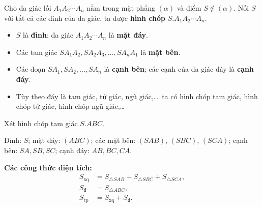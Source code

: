 \documentclass[11pt,a4paper]{article}
\newcommand{\exampletitle}[2]{\vspace{3pt}\noindent{\bfseries\textcolor{answerblue}{Ví dụ #1.}} #2\par\vspace{2pt}}
\begin{document}
Cho đa giác lồi $A_1A_2\cdots A_n$ nằm trong mặt phẳng $(\alpha)$
và điểm $S\notin(\alpha)$. Nối $S$ với tất cả các đỉnh của đa giác,
ta được \textbf{hình chóp} $S.A_1A_2\cdots A_n$.
\begin{itemize}
 \item $S$ là \textbf{đỉnh}; đa giác $A_1A_2\cdots A_n$ là \textbf{mặt đáy}.
 \item Các tam giác $SA_1A_2,SA_2A_3,\ldots,SA_nA_1$
 là \textbf{mặt bên}.
 \item Các đoạn $SA_1,SA_2,\ldots,SA_n$ là \textbf{cạnh bên};
 các cạnh của đa giác đáy là \textbf{cạnh đáy}.
 \item Tùy theo đáy là tam giác, tứ giác, ngũ giác,\ldots\
 ta có hình chóp tam giác, hình chóp tứ giác, hình chóp ngũ giác,\ldots
\end{itemize}
\begin{center}
\end{center}
\exampletitle{01 [TDM21]}{Xét hình chóp tam giác $S.ABC$.}
Đỉnh: $S$; mặt đáy: $(ABC)$; các mặt bên: $(SAB)$, $(SBC)$,
$(SCA)$; cạnh bên: $SA,SB,SC$; cạnh đáy: $AB,BC,CA$.

\textbf{Các công thức diện tích:}
\[
 \begin{aligned}
 S_{\mathrm{xq}}&=S_{\triangle SAB}+S_{\triangle SBC}+S_{\triangle SCA},\\
 S_{\mathrm{đ}}&=S_{\triangle ABC},\\
 S_{\mathrm{tp}}&=S_{\mathrm{xq}}+S_{\mathrm{đ}}.
 \end{aligned}
\]
\end{document}
